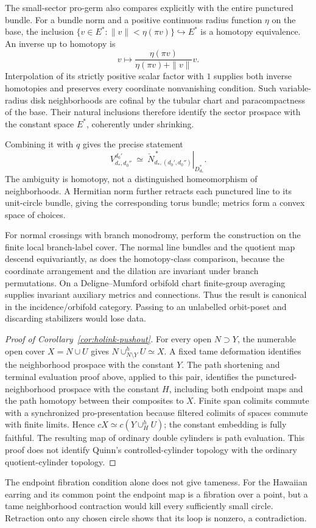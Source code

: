 \documentclass[11pt,a4paper]{article}
\theoremstyle{definition}
\begin{document}
The small-sector pro-germ also compares explicitly with the entire punctured bundle. For a bundle norm and a positive continuous radius function \(\eta\) on the base, the inclusion \(\{v\in E^*:\|v\|<\eta(\pi v)\}\hookrightarrow E^*\) is a homotopy equivalence. An inverse up to homotopy is \[
 v\longmapsto \frac{\eta(\pi v)}{\eta(\pi v)+\|v\|}v.
\] Interpolation of its strictly positive scalar factor with \(1\) supplies both inverse homotopies and preserves every coordinate nonvanishing condition. Such variable-radius disk neighborhoods are cofinal by the tubular chart and paracompactness of the base. Their natural inclusions therefore identify the sector prospace with the constant space \(E^*\), coherently under shrinking.

Combining it with \(q\) gives the precise statement \[
 V^{d_0'}_{d_*,d_0''}
 \ \simeq\
 \left.\check N_{d_*,(d_0',d_0'')}^{\,*}\right|_{D_{d_*}^*}.
\] The ambiguity is homotopy, not a distinguished homeomorphism of neighborhoods. A Hermitian norm further retracts each punctured line to its unit-circle bundle, giving the corresponding torus bundle; metrics form a convex space of choices.

For normal crossings with branch monodromy, perform the construction on the finite local branch-label cover. The normal line bundles and the quotient map descend equivariantly, as does the homotopy-class comparison, because the coordinate arrangement and the dilation are invariant under branch permutations. On a Deligne--Mumford orbifold chart finite-group averaging supplies invariant auxiliary metrics and connections. Thus the result is canonical in the incidence/orbifold category. Passing to an unlabelled orbit-poset and discarding stabilizers would lose data.


\begin{proof}[Proof of Corollary~\ref{cor:holink-pushout}]
For every open $N\supset Y$, the numerable open cover $X=N\cup U$
gives $N\cup^h_{N\setminus Y}U\simeq X$. A fixed tame deformation
identifies the neighborhood prospace with the constant $Y$. The path
shortening and terminal evaluation proof above, applied to this pair,
identifies the punctured-neighborhood prospace with the constant $H$,
including both endpoint maps and the path homotopy between their
composites to $X$. Finite span colimits commute with a synchronized
pro-presentation because filtered colimits of spaces commute with finite
limits. Hence $cX\simeq c(Y\cup^h_HU)$; the constant embedding is fully
faithful. The resulting map of ordinary double cylinders is path
evaluation. This proof does not identify Quinn's controlled-cylinder
topology with the ordinary quotient-cylinder topology.
\end{proof}
The endpoint fibration condition alone does not give tameness. For the
Hawaiian earring and its common point the endpoint map is a fibration
over a point, but a tame neighborhood contraction would kill every
sufficiently small circle. Retraction onto any chosen circle shows that
its loop is nonzero, a contradiction.
\end{document}
